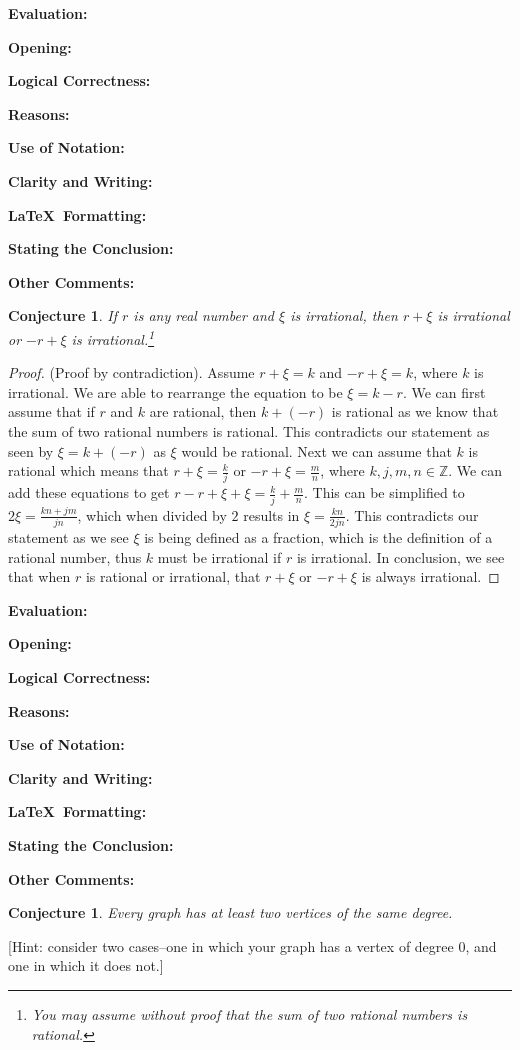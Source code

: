 \documentclass[11pt,titlepage]{article}		%
\def\rubric{\textbf{Evaluation:} \makebox[0.75in]{\hrulefill}

\vspace{.3in}

\textbf{Opening:} \makebox[0.75in]{\hrulefill}

\vspace{.3in}

\textbf{Logical Correctness:} \makebox[0.75in]{\hrulefill}

\vspace{.3in}

\textbf{Reasons:} \makebox[0.75in]{\hrulefill}

\vspace{.3in}

\textbf{Use of Notation:} \makebox[0.75in]{\hrulefill}

\vspace{.3in}

\textbf{Clarity and Writing:} \makebox[0.75in]{\hrulefill}

\vspace{.3in}

\textbf{\LaTeX\ Formatting:} \makebox[0.75in]{\hrulefill}

\vspace{.3in}

\textbf{Stating the Conclusion:} \makebox[0.75in]{\hrulefill}

\vspace{.3in}

\textbf{Other Comments:}

\vspace{1in}

}
\def\Z{{\mathbb Z}}
\newtheorem{conjecture}[theorem]{Conjecture}
\theoremstyle{definition}
\theoremstyle{theorem}
\begin{document}
\rubric


\clearpage

\begin{conjecture}
    If $r$ is any real number and $\xi$ is irrational, then $r + \xi$ is irrational or $-r + \xi$ is irrational.\footnote{You may assume without proof that the sum of two rational numbers is rational.}
\end{conjecture}

\begin{proof}
    (Proof by contradiction). Assume $r + \xi = k$ and $-r + \xi = k$, where $k$ is irrational. 
    We are able to rearrange the equation to be $\xi=k-r$. We can first assume that if $r$ and $k$ are rational, then $k+(-r)$ is rational as we know that the sum of two rational numbers is rational. This contradicts our statement as seen by $\xi=k+(-r)$ as $\xi$ would be rational.
    Next we can assume that $k$ is rational which means that $r+\xi=\frac{k}{j}$ or $-r+\xi=\frac{m}{n}$, where $k,j,m,n \in \Z$. We can add these equations to get $r-r+\xi+\xi=\frac{k}{j}+\frac{m}{n}$. This can be simplified to $2\xi=\frac{kn+jm}{jn}$, which when divided by $2$ results in $\xi=\frac{kn}{2jn}$. This contradicts our statement as we see $\xi$ is being defined as a fraction, which is the definition of a rational number, thus $k$ must be irrational if $r$ is irrational. In conclusion, we see that when $r$ is rational or irrational, that $r+\xi$ or $-r+\xi$ is always irrational.
\end{proof}

\rubric


\clearpage

\begin{conjecture}
    Every graph has at least two vertices of the same degree.
\end{conjecture}

[Hint: consider two cases--one in which your graph has a vertex of degree 0, and one in which it does not.]
\end{document}
